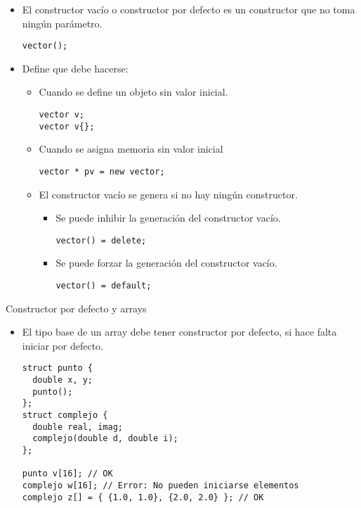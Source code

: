 \begin{frame}[fragile]
\begin{itemize}
  \item El \alert{constructor vacío} o \alert{constructor por defecto} es un constructor que no toma ningún parámetro.
\begin{lstlisting}
vector();
\end{lstlisting}
  \item Define que debe hacerse:
    \begin{itemize}
      \item Cuando se define un objeto sin valor inicial.
\begin{lstlisting}
vector v;
vector v{};
\end{lstlisting}
      \item Cuando se asigna memoria sin valor inicial
\begin{lstlisting}
vector * pv = new vector;
\end{lstlisting}
      \item El constructor vacío se genera si no hay ningún constructor.
        \begin{itemize}
          \item Se puede inhibir la generación del constructor vacío.
\begin{lstlisting}
vector() = delete;
\end{lstlisting}
          \item Se puede forzar la generación del constructor vacío.
\begin{lstlisting}
vector() = default;
\end{lstlisting}
        \end{itemize}
    \end{itemize}
\end{itemize}
\end{frame}

\begin{frame}[fragile]{Constructor por defecto y arrays}
\begin{itemize}
  \item El tipo base de un array debe tener constructor por defecto, si hace falta iniciar por defecto.
\begin{lstlisting}
struct punto {
  double x, y;
  punto();
};
struct complejo {
  double real, imag;
  complejo(double d, double i);
};

punto v[16]; // OK
complejo w[16]; // Error: No pueden iniciarse elementos
complejo z[] = { {1.0, 1.0}, {2.0, 2.0} }; // OK 
\end{lstlisting}
\end{itemize}
\end{frame}

